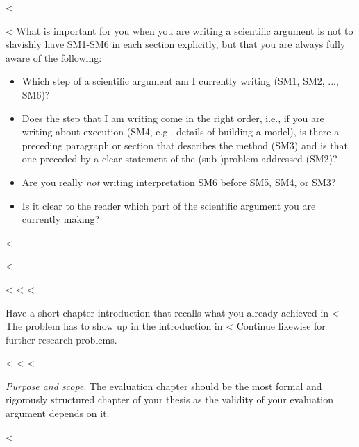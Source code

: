 {{{<%
\begin{mindflow}
<%
  What is important for you when you are writing a scientific argument is not to slavishly have SM1-SM6 in each section explicitly, but that you are always fully aware of the following:
  \begin{itemize}
    \item Which step of a scientific argument am I currently writing (SM1, SM2, ..., SM6)?
    \item Does the step that I am writing come in the right order, i.e., if you are writing about execution (SM4, e.g., details of building a model), is there a preceding paragraph or section that describes the method (SM3) and is that one preceded by a clear statement of the (sub-)problem addressed (SM2)?
    \item Are you really \emph{not} writing interpretation SM6 before SM5, SM4, or SM3?
    \item Is it clear to the reader which part of the scientific argument you are currently making?
  \end{itemize}
<%
\end{mindflow}
<%

<%
<%
<%

Have a short chapter introduction that recalls what you already achieved in <%
The problem has to show up in the introduction in <%
Continue likewise for further research problems.

<%
<%
<%

\emph{Purpose and scope}.
The evaluation chapter should be the most formal and rigorously structured chapter of your thesis as the validity of your evaluation argument depends on it.

<%

}}}
